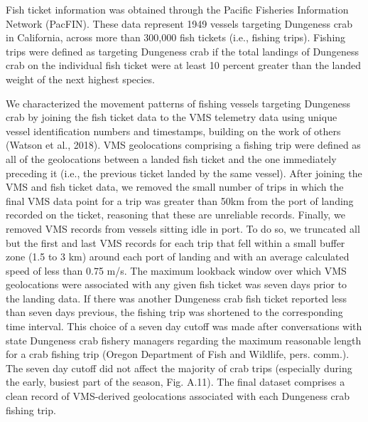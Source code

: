 \documentclass[]{elsarticle} %
\begin{document}
Fish ticket information was obtained through the Pacific Fisheries
Information Network (PacFIN). These data represent 1949 vessels
targeting Dungeness crab in California, across more than 300,000 fish
tickets (i.e., fishing trips). Fishing trips were defined as targeting
Dungeness crab if the total landings of Dungeness crab on the individual
fish ticket were at least 10 percent greater than the landed weight of
the next highest species.

We characterized the movement patterns of fishing vessels targeting
Dungeness crab by joining the fish ticket data to the VMS telemetry data
using unique vessel identification numbers and timestamps, building on
the work of others (Watson et al., 2018). VMS geolocations comprising a
fishing trip were defined as all of the geolocations between a landed
fish ticket and the one immediately preceding it (i.e., the previous
ticket landed by the same vessel). After joining the VMS and fish ticket
data, we removed the small number of trips in which the final VMS data
point for a trip was greater than 50km from the port of landing recorded
on the ticket, reasoning that these are unreliable records. Finally, we
removed VMS records from vessels sitting idle in port. To do so, we
truncated all but the first and last VMS records for each trip that fell
within a small buffer zone (1.5 to 3 km) around each port of landing and
with an average calculated speed of less than 0.75 m/s. The maximum
lookback window over which VMS geolocations were associated with any
given fish ticket was seven days prior to the landing data. If there was
another Dungeness crab fish ticket reported less than seven days
previous, the fishing trip was shortened to the corresponding time
interval. This choice of a seven day cutoff was made after conversations
with state Dungeness crab fishery managers regarding the maximum
reasonable length for a crab fishing trip (Oregon Department of Fish and
Wildlife, pers. comm.). The seven day cutoff did not affect the majority
of crab trips (especially during the early, busiest part of the season,
Fig. A.11). The final dataset comprises a clean record of VMS-derived
geolocations associated with each Dungeness crab fishing trip.
\end{document}
